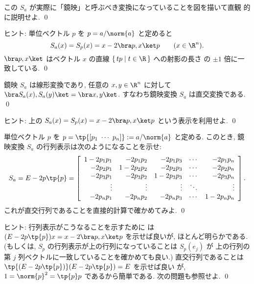 \documentclass[12pt,twoside]{jarticle}
\begin{document}
\begin{question}
  この $S_a$ が実際に「鏡映」と呼ぶべき変換になっていることを図を描いて直観
  的に説明せよ.  \qed
\end{question}

\noindent
ヒント: 単位ベクトル $p$ を $p=a/\norm{a}$ と定めると
\begin{equation*}
  S_a(x) = S_p(x) = x - 2\bra p,x\ket p
  \qquad (x\in\R^n).
\end{equation*}
$\bra p,x\ket$ はベクトル $x$ の直線 $\{\,tp\mid t\in\R\,\}$ への射影の長さ
の $\pm1$ 倍に一致している.
\qed
  

\begin{question}
  鏡映 $S_a$ は線形変換であり, 
  任意の $x,y\in\R^n$ に対して $\bra S_a(x),S_a(y)\ket = \bra x,y\ket$. 
  すなわち鏡映変換 $S_a$ は直交変換である.  \qed
\end{question}

\noindent
ヒント: 上の $S_a(x) = S_p(x) =  x - 2\bra p,x\ket p$ という表示を利用せよ.
\qed


\begin{question}
  単位ベクトル $p$ を $p=\tp{[p_1\ \cdots\ p_n]} := a/\norm{a}$ と定める.  
  このとき, 鏡映変換 $S_a$ の行列表示は次のようになることを示せ:
  \begin{equation*}
    S_a = 
    E - 2p\tp{p} =
    \left[
    \begin{array}{rrrcr}
      1 - 2p_1p_1 &   - 2p_1p_2 &   - 2p_1p_3 & \cdots &   - 2p_1p_n \\
        - 2p_2p_1 & 1 - 2p_2p_2 &   - 2p_2p_3 & \cdots &   - 2p_2p_n \\
        - 2p_3p_1 &   - 2p_3p_2 & 1 - 2p_3p_3 & \cdots &   - 2p_3p_n \\
        \vdots    &   \vdots    &   \vdots    & \ddots &   \vdots    \\
        - 2p_np_1 &   - 2p_np_2 &   - 2p_np_3 & \cdots & 1 - 2p_np_n \\
    \end{array}
    \right].
  \end{equation*}
  これが直交行列であることを直接的計算で確かめてみよ. \qed
\end{question}

\noindent
ヒント: 行列表示がこうなることを示すために
は $(E-2p\tp{p})x = x-2\bra p,x\ket p$ を示せば良いが, ほとんど明らかである.
(もしくは, $S_p$ の行列表示が上の行列になっていることは $S_p(e_j)$ が
上の行列の第 $j$ 列ベクトルに一致していることを確かめても良い.)
直交行列であることは $\tp{(E-2p\tp{p})}(E-2p\tp{p})=E$ を示せば良い
が, $1=\norm{p}^2=\tp{p}p$ であるから簡単である.  
次の問題も参照せよ. 
\qed
\end{document}

